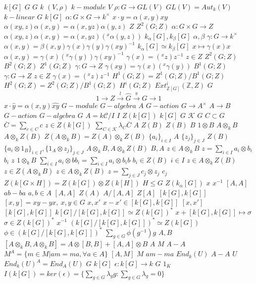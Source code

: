 \documentclass{article}
\begin{document}
$k[G]$
$G$
$G$
$k$
$(V,\rho)$
$k-module$
$V$
$\rho:G \rightarrow GL(V)$
$GL(V)=Aut_k(V)$
$k-linear$
$G$
$k[G]$
$\alpha:G \times G \rightarrow k^\times$
$x \cdot y=\alpha(x,y) xy$
$\alpha(xy,z)\alpha(x,y)=\alpha(x,yz)\alpha(y,z)$
$Z$
$Z^2(G;Z)$
$\alpha:G \times G \rightarrow Z$
$\alpha(xy,z)\alpha(x,y)=\alpha(x,yz)(^x\alpha(y,z))$
$k_\alpha[G],k_\beta[G]$
$\alpha,\beta$
$\gamma:G \rightarrow k^\times$
$\alpha(x,y)=\beta(x,y)\gamma(x)\gamma(y)\gamma(xy)^{-1}$
$k_\alpha[G] \simeq k_\beta[G]$
$x \mapsto \gamma(x)x$
$\alpha(x,y)=\gamma(x)(^x\gamma(y))\gamma(xy)^{-1}$
$\gamma(x)=(^xz)z^{-1}$
$z \in Z$
$Z^2(G;Z)$
$B^2(G;Z)$
$Z^1(G;Z)$
$\gamma:G \rightarrow Z$
$\gamma(xy)=\gamma(x)(^x\gamma(y))$
$B^1(G;Z)$
$\gamma:G \rightarrow Z$
$z \in Z$
$\gamma(x)=(^xz)z^{-1}$
$H^1(G;Z)=Z^1(G;Z)/B^1(G;Z)$
$H^2(G;Z)=Z^2(G;Z)/B^1(G;Z)$
$H^i(G;Z)$
$Ext_{\mathbb{Z}[G]}^i(\mathbb{Z},Z)$
$G$
$$
1 \longrightarrow Z \stackrel{l}{\longrightarrow} \widehat{G} \stackrel{\pi}{\longrightarrow} G \longrightarrow 1
$$
$\widehat{x}\cdot\widehat{y}=\alpha(x,y)\widehat{xy}$
$G-module$
$G-algebra$
$A$
$G-action$
$G \rightarrow A^\times$
$A \rightarrow B$
$G-action$
$G-algebra$
$G$
$A=k\mathcal{C}/I$
$I$
$Z(k[G])$
$k[G]$
$G$
$\mathcal{K}$
$G$
$C \subset G$
$\overline{C}=\sum_{c\in C}c$
$z \in Z(k[G])$
$\sum_{C \in \mathcal{K}}\lambda_C\overline{C}$
$A$
$Z(B)$
$Z(B)$
$B$
$1 \otimes B$
$A \otimes_k B$
$A \otimes_k Z(B)$
$Z(A \otimes_k B)= Z(A) \otimes_k Z(B)$
$\{a_i\}_{i \in I}$
$A$
$\{z_j\}_{j \in J}$
$Z(B)$
$\{a_i \otimes 1_B\}_{i \in I},\{1_A \otimes z_j\}_{j \in J}$
$A \otimes_k B,A \otimes_k Z(B)$
$B,A$
$z \in A \otimes_k B$
$z=\sum_{i \in I}a_i \otimes b_i$
$b_i$
$z$
$1 \otimes_k B$
$\sum_{i \in I}a_i \otimes bb_i=\sum_{i \in I}a_i \otimes b_ib$
$b_i \in Z(B)$
$i \in I$
$z \in A \otimes_k Z(B)$
$z \in Z(A \otimes_k B)$
$z \in A \otimes_k Z(B)$
$z=\sum_{j \in J}c_j \otimes z_j$
$c_j$
$Z(k[G \times H])=Z(k[G]) \otimes Z(k[H])$
$H \leq G$
$Z(k_{\alpha}[G])$
$x$
$x^{-1}$
$[A,A]$
$ab-ba$
$a,b \in A$
$[A,A]$
$Z(A)$
$A/[A,A]$
$Z[A]$
$[k[G],k[G]]$
$[x,y]=xy-yx,\  x,y \in G$
$x,x'$
$x-x' \in [k[G],k[G]]$
$[x,x']$
$[k[G],k[G]]$
$k[G]/[k[G],k[G]] \simeq Z(k[G])^*$
$x+[k[G],k[G]] \mapsto \sigma$
$\sigma \in Z(k[G])^*$
$x^{-1}$
$(k[G]/[k[G],k[G]])^* \simeq Z(k[G])$
$\phi \in (k[G]/[k[G],k[G]])^*$
$\sum_{g \in G} \phi(g^{-1})g$
$A,B$
$[A \otimes_k B,A \otimes_k B]=A \otimes [B,B]+[A,A] \otimes B$
$A$
$M$
$A-A$
$M^A=\{m \in M | am=ma, \forall a \in A\}$
$[A,M]$
$M$
$am-ma$
$End_k(U)$
$A-A$
$U$
$End_k(U)^A=End_A(U)$
$G$
$k[G]$
$\epsilon:k[G] \rightarrow k$
$G$
$1_K$
$I(k[G])=ker(\epsilon)= \{\sum_{g \in G} \lambda_g g: \sum_{g \in G} \lambda_g=0\}$
\end{document}
